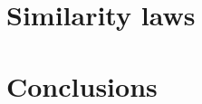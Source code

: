 \documentclass[a4paper,fleqn]{cas-dc}
\begin{document}
\section{Similarity laws}



\section{Conclusions}




%





%
%
\end{document}
